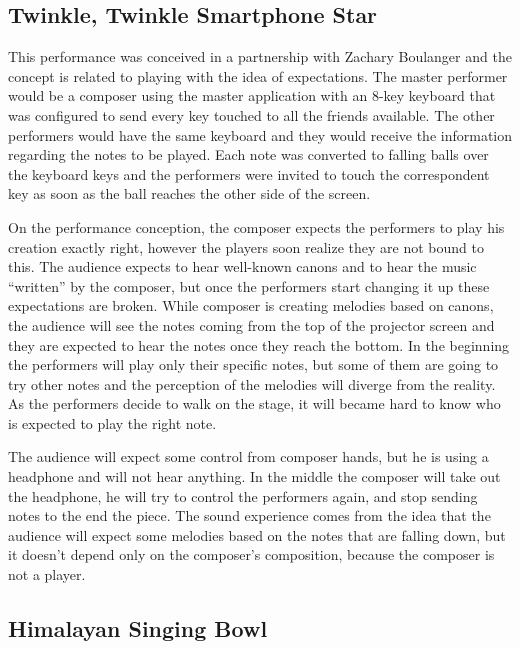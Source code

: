 \subsection*{Twinkle, Twinkle Smartphone Star}

This performance was conceived in a partnership with Zachary Boulanger and the concept is related to playing with the idea of expectations. 
The master performer would be a composer using the master application with an 8-key keyboard that was configured to send every key touched to all the friends available.
The other performers would have the same keyboard and they would receive the information regarding the notes to be played.
Each note was converted to falling balls over the keyboard keys and the performers were invited to touch the correspondent key as soon as the ball reaches the other side of the screen.

On the performance conception, the composer expects the performers to play his creation exactly right, however the players soon realize they are not bound to this.
The audience expects to hear well-known canons and to hear the music ``written'' by the composer, but once the performers start changing it up these expectations are broken.
While composer is creating melodies based on canons, the audience will see the notes coming from the top of the projector screen and they are expected to hear the notes once they reach the bottom. 
In the beginning the performers will play only their specific notes, but some of them are going to try other notes and the perception of the melodies will diverge from the reality. 
As the performers decide to walk on the stage, it will became hard to know who is expected to play the right note.

The audience will expect some control from composer hands, but he is using a headphone and will not hear anything. 
In the middle the composer will take out the headphone, he will try to control the performers again, and stop sending notes to the end the piece.
The sound experience comes from the idea that the audience will expect some melodies based on the notes that are falling down, but it doesn't depend only on the composer's composition, because the composer is not a player.

\subsection*{Himalayan Singing Bowl}

